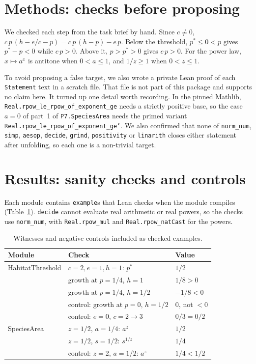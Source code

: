 \documentclass[11pt]{article}
\begin{document}
\section{Methods: checks before proposing}
We checked each step from the task brief by hand. Since $c\neq0$, $c\,p\,(h-e/c-p)=c\,p\,(h-p)-e\,p$.
Below the threshold, $p^*\le0<p$ gives $p^*-p<0$ while $c\,p>0$. Above it, $p>p^*>0$ gives $c\,p>0$.
For the power law, $x\mapsto a^x$ is antitone when $0<a\le1$, and $1/z\ge1$ when $0<z\le1$.

To avoid proposing a false target, we also wrote a private Lean proof of each \texttt{Statement}
text in a scratch file. That file is not part of this package and supports no claim here. It
turned up one detail worth recording. In the pinned Mathlib,
\texttt{Real.rpow\_le\_rpow\_of\_exponent\_ge} needs a strictly positive base, so the case $a=0$
of part~1 of \texttt{P7.SpeciesArea} needs the primed variant
\texttt{Real.rpow\_le\_rpow\_of\_exponent\_ge'}. We also confirmed that none of
\texttt{norm\_num}, \texttt{simp}, \texttt{aesop}, \texttt{decide}, \texttt{grind},
\texttt{positivity} or \texttt{linarith} closes either statement after unfolding, so each one is
a non-trivial target.

\section{Results: sanity checks and controls}
Each module contains \texttt{example}s that Lean checks when the module compiles
(Table~\ref{tab:checks}). \texttt{decide} cannot evaluate real arithmetic or real powers, so the
checks use \texttt{norm\_num}, with \texttt{Real.rpow\_mul} and \texttt{Real.rpow\_natCast} for the
powers.

\begin{table}[h]\centering
\begin{tabular}{@{}lll@{}}\toprule
Module & Check & Value \\\midrule
HabitatThreshold & $c=2,e=1,h=1$: $p^*$ & $1/2$ \\
 & growth at $p=1/4$, $h=1$ & $1/8>0$ \\
 & growth at $p=1/4$, $h=1/2$ & $-1/8<0$ \\
 & control: growth at $p=0$, $h=1/2$ & $0$, not $<0$ \\
 & control: $e=0$, $c=2\to3$ & $0/3=0/2$ \\
SpeciesArea & $z=1/2$, $a=1/4$: $a^z$ & $1/2$ \\
 & $z=1/2$, $s=1/2$: $s^{1/z}$ & $1/4$ \\
 & control: $z=2$, $a=1/2$: $a^z$ & $1/4<1/2$ \\\bottomrule
\end{tabular}
\caption{Witnesses and negative controls included as checked examples.}\label{tab:checks}
\end{table}
\end{document}
